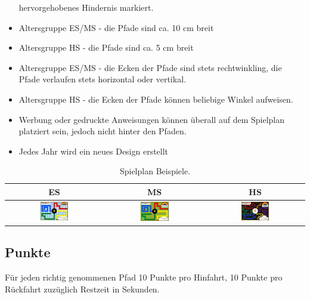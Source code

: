 \documentclass[a4paper,12pt]{article}
\begin{document}
\begin{itemize}
		hervorgehobenes Hindernis markiert.
	\item Altersgruppe ES/MS - die Pfade sind ca. 10 cm breit
	\item Altersgruppe HS - die Pfade sind ca. 5 cm breit
	\item Altersgruppe ES/MS - die Ecken der Pfade sind stets
		rechtwinkling, die Pfade verlaufen stets horizontal oder
		vertikal.
	\item Altersgruppe HS - die Ecken der Pfade können beliebige Winkel
		aufweisen.
	\item Werbung oder gedruckte Anweisungen können überall auf dem
		Spielplan platziert sein, jedoch nicht hinter den Pfaden.
	\item Jedes Jahr wird ein neues Design erstellt
\end{itemize}

\begin{center}
\begin{table}
	\begin{tabular}{|c|c|c|} \hline
		ES & MS & HS \\
		\hline
\includegraphics[width=0.3\textwidth]{images/cyberspace/rainbow_es.png}
&
\includegraphics[width=0.3\textwidth]{images/cyberspace/rainbow_ms.png}
&
\includegraphics[width=0.3\textwidth]{images/cyberspace/rainbow_hs.png}
\\
    		\hline
	\end{tabular}
\caption{\label{tab:table-name}Spielplan Beispiele.}
\end{table}
\end{center}

\subsection{Punkte}

Für jeden richtig genommenen Pfad 10 Punkte pro Hinfahrt, 10 Punkte pro
Rückfahrt zuzüglich Restzeit in Sekunden.
\end{document}

